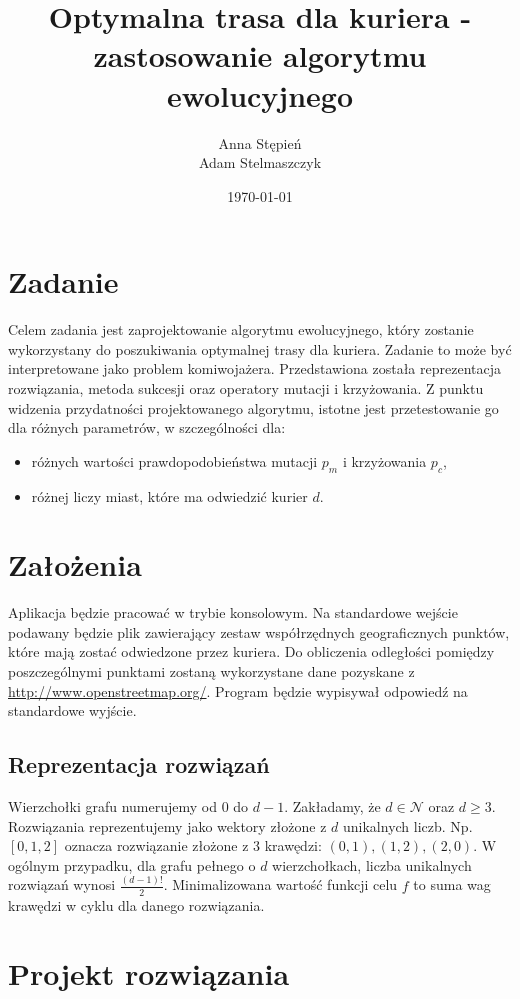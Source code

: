 \documentclass[12pt, a4paper]{article}
\title{\textbf{Optymalna trasa dla kuriera - zastosowanie algorytmu ewolucyjnego}}
\author{Anna Stępień \\ Adam Stelmaszczyk}
\date{\today}
\begin{document}
\maketitle

\section{Zadanie}
Celem zadania jest zaprojektowanie algorytmu ewolucyjnego, który zostanie wykorzystany do poszukiwania optymalnej trasy dla kuriera. Zadanie to może być interpretowane jako problem komiwojażera.
Przedstawiona została reprezentacja rozwiązania, metoda sukcesji oraz operatory mutacji i krzyżowania. 
Z punktu widzenia przydatności projektowanego algorytmu, istotne jest przetestowanie go dla różnych parametrów, w szczególności dla:
\begin{itemize}
	\item różnych wartości prawdopodobieństwa mutacji $p_m$ i krzyżowania $p_c$,
	\item różnej liczy miast, które ma odwiedzić kurier $d$.
\end{itemize}

\section{Założenia}
Aplikacja będzie pracować w trybie konsolowym. Na standardowe wejście podawany będzie plik zawierający zestaw współrzędnych geograficznych punktów, które mają zostać odwiedzone przez kuriera. Do obliczenia odległości pomiędzy poszczególnymi punktami zostaną wykorzystane dane pozyskane z \url{http://www.openstreetmap.org/}.
Program będzie wypisywał odpowiedź na standardowe wyjście.

\subsection{Reprezentacja rozwiązań}

Wierzchołki grafu numerujemy od 0 do $d - 1$. Zakładamy, że $d \in \mathcal{N}$ oraz $d \geq 3$. 
Rozwiązania reprezentujemy jako wektory złożone z $d$ unikalnych liczb. 
Np. $[0,1,2]$ oznacza rozwiązanie złożone z 3 krawędzi: $(0,1), (1,2), (2,0)$. 
W ogólnym przypadku, dla grafu pełnego o $d$ wierzchołkach, liczba unikalnych rozwiązań wynosi $\frac{(d-1)!}{2}$. 
Minimalizowana wartość funkcji celu $f$ to suma wag krawędzi w cyklu dla danego rozwiązania.

\section{Projekt rozwiązania}
\end{document}
